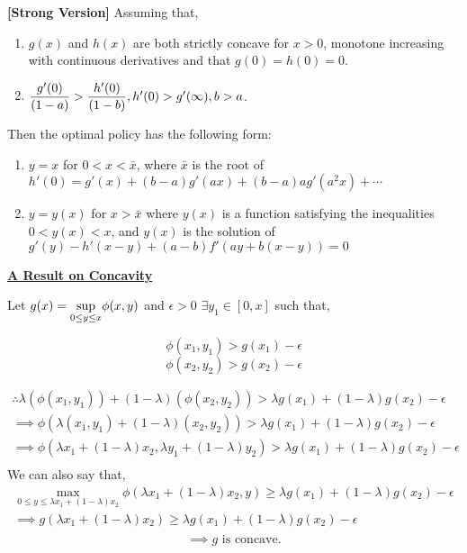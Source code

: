 \begin{theorem}
    \textbf{[Strong Version]} Assuming that,
    \begin{enumerate}
        \item $g(x)$ and $h(x)$ are both strictly concave for $x > 0$, monotone increasing with continuous derivatives and that $g(0) = h(0) = 0$.
        \item $\mathlarger{\frac{g'(0)}{(1 - a)} > \frac{h'(0)}{(1 - b)}}, h'(0) > g'(\infty), b > a$.
    \end{enumerate}
    Then the optimal policy has the following form:
    \begin{enumerate}
        \item $y=x$ for $0<x<\bar{x}$, where $\bar{x}$ is the root of $h'(0)=g'(x)+(b-a)g'(ax)+(b-a)ag'(a^2x) +\cdots$
        \item $y=y(x)$ for $x > \bar{x}$ where $y(x)$ is a function satisfying the inequalities $0 < y(x) < x$, and $y(x)$ is the solution of $\boxed{g'(y)-h'(x-y)+(a-b)f'(ay+b(x-y))=0}$
    \end{enumerate}
\end{theorem}

\begin{tcolorbox}
    \begin{center}
        \textbf{\underline{A Result on Concavity}}
    \end{center}
    Let $g(x) = \mathlarger{\sup_{0\le y \le x}} \phi(x,y)$ and $\epsilon > 0$ $\exists y_1 \in [0, x]$ such that, 

    $$\phi(x_1, y_1) > g(x_1) - \epsilon$$
    $$\phi(x_2, y_2) > g(x_2) - \epsilon$$

    \begin{align*}
        \therefore \lambda(\phi(x_1, y_1)) + (1-\lambda)(\phi(x_2, y_2)) > \lambda g(x_1) + (1-\lambda)g(x_2) - \epsilon \\
        \implies \phi (\lambda (x_1, y_1) + (1-\lambda)(x_2, y_2)) > \lambda g(x_1) + (1-\lambda)g(x_2) - \epsilon \\
        \implies \phi (\lambda x_1 + (1-\lambda)x_2, \lambda y_1 + (1-\lambda)y_2) > \lambda g(x_1) + (1-\lambda)g(x_2) - \epsilon \\
    \end{align*}
    We can also say that, 
    \begin{align*}
        {\max_{0 \le y \le \lambda x_1 + (1-\lambda)x_2}} \phi (\lambda x_1 + (1-\lambda)x_2, y) \ge \lambda g(x_1) + (1-\lambda)g(x_2) - \epsilon \\
        \implies g(\lambda x_1 + (1-\lambda)x_2) \ge \lambda g(x_1) + (1-\lambda)g(x_2) - \epsilon \\
    \end{align*}
    \vspace{-1cm}
    $$\implies g \text{ is concave.}$$
\end{tcolorbox}


